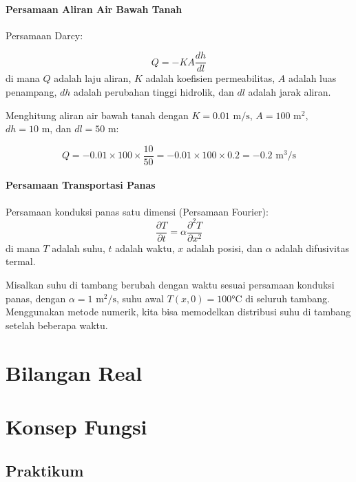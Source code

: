 \documentclass[
]{book}
\begin{document}
\subsubsection*{Persamaan Aliran Air Bawah Tanah}\label{persamaan-aliran-air-bawah-tanah}

Persamaan Darcy:

\[
Q = -KA \frac{dh}{dl}
\]
di mana \(Q\) adalah laju aliran, \(K\) adalah koefisien permeabilitas, \(A\) adalah luas penampang, \(dh\) adalah perubahan tinggi hidrolik, dan \(dl\) adalah jarak aliran.

Menghitung aliran air bawah tanah dengan \(K = 0.01 \text{ m/s}\), \(A = 100 \text{ m}^2\), \(dh = 10 \text{ m}\), dan \(dl = 50 \text{ m}\):

\[
Q = -0.01 \times 100 \times \frac{10}{50} = -0.01 \times 100 \times 0.2 = -0.2 \text{ m}^3/\text{s}
\]

\subsubsection{Persamaan Transportasi Panas}\label{persamaan-transportasi-panas}

Persamaan konduksi panas satu dimensi (Persamaan Fourier):
\[
\frac{\partial T}{\partial t} = \alpha \frac{\partial^2 T}{\partial x^2}
\]
di mana \(T\) adalah suhu, \(t\) adalah waktu, \(x\) adalah posisi, dan \(\alpha\) adalah difusivitas termal.

Misalkan suhu di tambang berubah dengan waktu sesuai persamaan konduksi panas, dengan \(\alpha = 1 \text{ m}^2/\text{s}\), suhu awal \(T(x, 0) = 100 \text{°C}\) di seluruh tambang. Menggunakan metode numerik, kita bisa memodelkan distribusi suhu di tambang setelah beberapa waktu.

\chapter{Bilangan Real}\label{Bilangan_Real}

\chapter{Konsep Fungsi}\label{Konsep_Fungsi}

\section{Praktikum}\label{praktikum}
\end{document}
